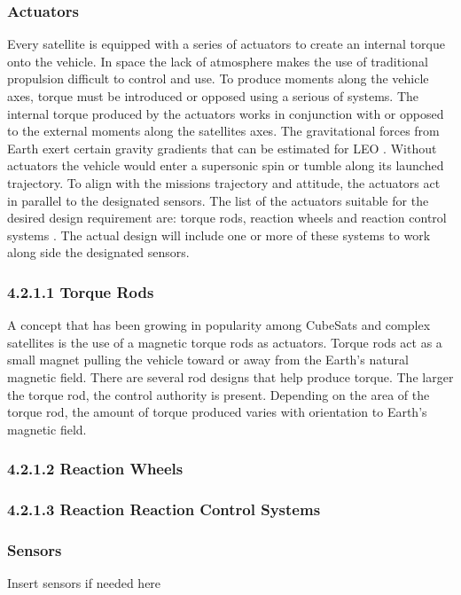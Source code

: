 \documentclass[3p]{elsarticle}
\begin{document}
\subsubsection{Actuators}
Every satellite is equipped with a series of actuators to create an internal torque onto the vehicle. In space the lack of atmosphere makes the use of traditional propulsion difficult to control and use. To produce moments along the vehicle axes, torque must be introduced or opposed using a serious of systems. The internal torque produced by the actuators works in conjunction with or opposed to the external moments along the satellites axes. The gravitational forces from Earth exert certain gravity gradients that can be estimated for LEO \cite{AttSim}. Without actuators the vehicle would enter a supersonic spin or tumble along its launched trajectory. To align with the missions trajectory and attitude, the actuators act in parallel to the designated sensors. The list of the actuators suitable for the desired design requirement are: torque rods, reaction wheels and reaction control systems . The actual design will include one or more of these systems to work along side the designated sensors.
%
\subsubsection*{4.2.1.1 Torque Rods}
A concept that has been growing in popularity among CubeSats and complex satellites is the use of a magnetic torque rods as actuators. Torque rods act as a small magnet pulling the vehicle toward or away from the Earth's natural magnetic field. There are several rod designs that help produce torque. The larger the torque rod, the control authority is present.  Depending on the area of the torque rod, the amount of torque produced varies with orientation to Earth's magnetic field.
%
\subsubsection*{4.2.1.2 Reaction Wheels}

\subsubsection*{4.2.1.3 Reaction Reaction Control Systems}

\subsubsection{Sensors}
Insert sensors if needed here
\end{document}
